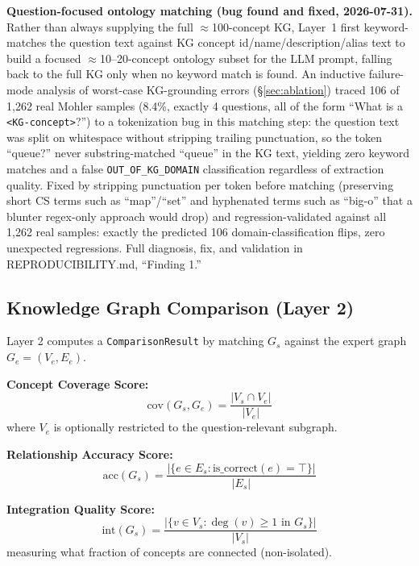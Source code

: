 \documentclass[conference]{IEEEtran}
\begin{document}
\textbf{Question-focused ontology matching (bug found and fixed,
2026-07-31).} Rather than always supplying the full $\approx$100-concept
KG, Layer~1 first keyword-matches the question text against KG concept
id/name/description/alias text to build a focused $\approx$10--20-concept
ontology subset for the LLM prompt, falling back to the full KG only when
no keyword match is found. An inductive failure-mode analysis of
worst-case KG-grounding errors (\S\ref{sec:ablation}) traced 106 of 1{,}262
real Mohler samples (8.4\%, exactly 4 questions, all of the form ``What is
a \texttt{<KG-concept>}?'') to a tokenization bug in this matching step:
the question text was split on whitespace without stripping trailing
punctuation, so the token ``queue?'' never substring-matched ``queue'' in
the KG text, yielding zero keyword matches and a false
\texttt{OUT\_OF\_KG\_DOMAIN} classification regardless of extraction
quality. Fixed by stripping punctuation per token before matching
(preserving short CS terms such as ``map''/``set'' and hyphenated terms
such as ``big-o'' that a blunter regex-only approach would drop) and
regression-validated against all 1{,}262 real samples: exactly the
predicted 106 domain-classification flips, zero unexpected regressions.
Full diagnosis, fix, and validation in REPRODUCIBILITY.md, ``Finding 1.''

\subsection{Knowledge Graph Comparison (Layer 2)}
\label{subsec:comparison}

Layer 2 computes a \texttt{ComparisonResult} by matching $G_s$ against the expert
graph $G_e = (V_e, E_e)$.

\textbf{Concept Coverage Score:}
\begin{equation}
  \text{cov}(G_s, G_e) = \frac{|V_s \cap V_e|}{|V_e|}
  \label{eq:coverage}
\end{equation}
where $V_e$ is optionally restricted to the question-relevant subgraph.

\textbf{Relationship Accuracy Score:}
\begin{equation}
  \text{acc}(G_s) = \frac{|\{e \in E_s : \text{is\_correct}(e) = \top\}|}{|E_s|}
  \label{eq:accuracy}
\end{equation}

\textbf{Integration Quality Score:}
\begin{equation}
  \text{int}(G_s) = \frac{|\{v \in V_s : \deg(v) \geq 1 \text{ in } G_s\}|}{|V_s|}
  \label{eq:integration}
\end{equation}
measuring what fraction of concepts are connected (non-isolated).
\end{document}
